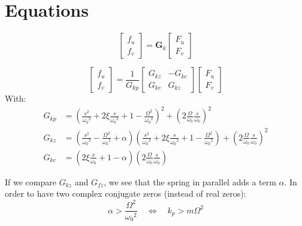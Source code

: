 \documentclass[a4paper, 10pt, DIV=12, parskip=full]{scrreprt}
\begin{document}
\section{Equations}
\label{sec:org0de17db}
\begin{important}
\begin{equation}
\begin{bmatrix} f_u \\ f_v \end{bmatrix} =
\bm{G}_k
\begin{bmatrix} F_u \\ F_v \end{bmatrix}
\end{equation}

\begin{equation}
\begin{bmatrix} f_u \\ f_v \end{bmatrix} =
\frac{1}{G_{kp}}
\begin{bmatrix}
   G_{kz} & -G_{kc} \\
   G_{kc} &  G_{kz}
\end{bmatrix}
\begin{bmatrix} F_u \\ F_v \end{bmatrix}
\end{equation}
With:
\begin{align}
  G_{kp} &= \left( \frac{s^2}{{\omega_0}^2} + 2\xi \frac{s}{{\omega_0}^2} + 1 - \frac{\Omega^2}{{\omega_0}^2} \right)^2 + \left( 2 \frac{\Omega}{\omega_0}\frac{s}{\omega_0} \right)^2 \\
  G_{kz} &= \left( \frac{s^2}{{\omega_0}^2} - \frac{\Omega^2}{{\omega_0}^2} + \alpha \right) \left( \frac{s^2}{{\omega_0}^2} + 2\xi \frac{s}{{\omega_0}^2} + 1 - \frac{\Omega^2}{{\omega_0}^2} \right) + \left( 2 \frac{\Omega}{\omega_0}\frac{s}{\omega_0} \right)^2 \\
  G_{kc} &= \left( 2 \xi \frac{s}{\omega_0} + 1 - \alpha \right) \left( 2 \frac{\Omega}{\omega_0}\frac{s}{\omega_0} \right)
\end{align}
\end{important}

If we compare \(G_{kz}\) and \(G_{fz}\), we see that the spring in parallel adds a term \(\alpha\).
In order to have two complex conjugate zeros (instead of real zeros):
\begin{equation}
  \alpha > \frac{\Omega^2}{{\omega_0}^2} \quad \Leftrightarrow \quad k_p > m \Omega^2
\end{equation}
\end{document}
